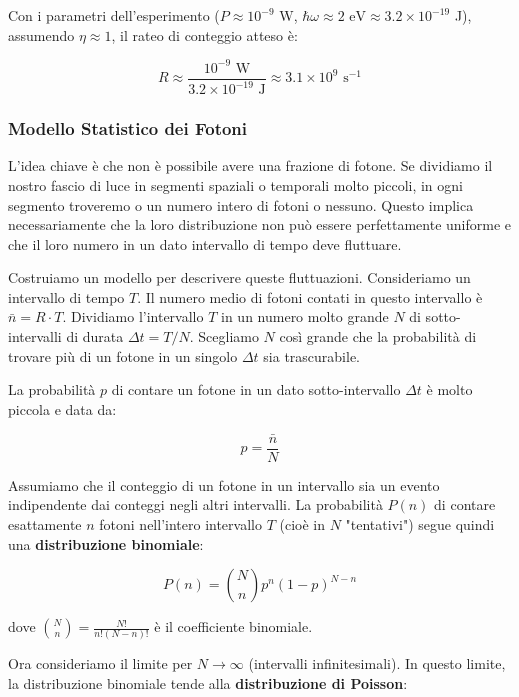 Con i parametri dell'esperimento ($P \approx 10^{-9}$ W, $\hbar\omega \approx 2 \text{ eV} \approx 3.2 \times 10^{-19}$ J), assumendo $\eta \approx 1$, il rateo di conteggio atteso è:

\begin{equation}
 R \approx \frac{10^{-9} \text{ W}}{3.2 \times 10^{-19} \text{ J}} \approx 3.1 \times 10^9 \text{ s}^{-1}
\end{equation}

\subsubsection*{Modello Statistico dei Fotoni}
L'idea chiave è che non è possibile avere una frazione di fotone. Se dividiamo il nostro fascio di luce in segmenti spaziali o temporali molto piccoli, in ogni segmento troveremo o un numero intero di fotoni o nessuno. Questo implica necessariamente che la loro distribuzione non può essere perfettamente uniforme e che il loro numero in un dato intervallo di tempo deve fluttuare.

Costruiamo un modello per descrivere queste fluttuazioni.
Consideriamo un intervallo di tempo $T$. Il numero medio di fotoni contati in questo intervallo è $\bar{n} = R \cdot T$.
Dividiamo l'intervallo $T$ in un numero molto grande $N$ di sotto-intervalli di durata $\Delta t = T/N$. Scegliamo $N$ così grande che la probabilità di trovare più di un fotone in un singolo $\Delta t$ sia trascurabile.

La probabilità $p$ di contare un fotone in un dato sotto-intervallo $\Delta t$ è molto piccola e data da:

\begin{equation}
 p = \frac{\bar{n}}{N}
\end{equation}

Assumiamo che il conteggio di un fotone in un intervallo sia un evento indipendente dai conteggi negli altri intervalli. La probabilità $P(n)$ di contare esattamente $n$ fotoni nell'intero intervallo $T$ (cioè in $N$ "tentativi") segue quindi una \textbf{distribuzione binomiale}:

\begin{equation}
 P(n) = \binom{N}{n} p^n (1-p)^{N-n}
\end{equation}

dove $\binom{N}{n} = \frac{N!}{n!(N-n)!}$ è il coefficiente binomiale.

Ora consideriamo il limite per $N \to \infty$ (intervalli infinitesimali). In questo limite, la distribuzione binomiale tende alla \textbf{distribuzione di Poisson}:


